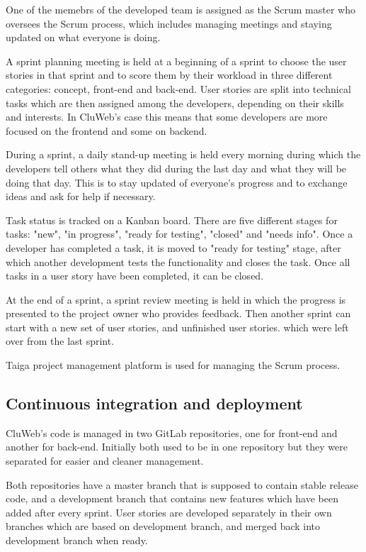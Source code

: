 One of the memebrs of the developed team is assigned as the Scrum master who oversees the Scrum process, which includes managing meetings and staying updated on what everyone is doing.

A sprint planning meeting is held at a beginning of a sprint to choose the user stories in that sprint and to score them by their workload in three different categories: concept, front-end and back-end. User stories are split into technical tasks which are then assigned among the developers, depending on their skills and interests. In CluWeb's case this means that some developers are more focused on the frontend and some on backend.

During a sprint, a daily stand-up meeting is held every morning during which the developers tell others what they did during the last day and what they will be doing that day. This is to stay updated of everyone's progress and to exchange ideas and ask for help if necessary.

Task status is tracked on a Kanban board. There are five different stages for tasks: "new", "in progress", "ready for testing", "closed" and "needs info". Once a developer has completed a task, it is moved to "ready for testing" stage, after which another development tests the functionality and closes the task. Once all tasks in a user story have been completed, it can be closed.

At the end of a sprint, a sprint review meeting is held in which the progress is presented to the project owner who provides feedback. Then another sprint can start with a new set of user stories, and unfinished user stories. which were left over from the last sprint.

\cite{scrum}

Taiga project management platform is used for managing the Scrum process.

\subsection{Continuous integration and deployment}
CluWeb's code is managed in two GitLab repositories, one for front-end and another for back-end. Initially both used to be in one repository but they were separated for easier and cleaner management.

Both repositories have a master branch that is supposed to contain stable release code, and a development branch that contains new features which have been added after every sprint. User stories are developed separately in their own branches which are based on development branch, and merged back into development branch when ready.

